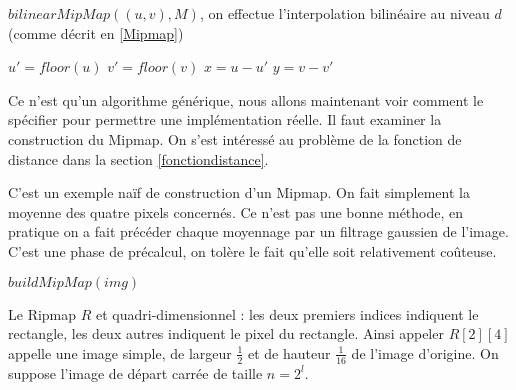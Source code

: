 \medbreak
\medbreak
\medbreak
\medbreak

\begin{algorithm}[H]
\caption{$bilinearMipMap((u,v),M)$,  on effectue l'interpolation bilinéaire au niveau $d$ (comme décrit en \ref{Mipmap})}
\label{intertri2}
$u'=floor(u)$\;
$v' = floor(v)$\;
$x=u-u'$\;
$y = v-v'$\;
\;
\end{algorithm}

\medbreak
\medbreak
Ce n'est qu'un algorithme générique, nous allons maintenant voir comment le spécifier pour permettre une implémentation réelle. Il faut examiner la construction du Mipmap. On s'est intéressé au problème de la fonction de distance dans la section \ref{fonctiondistance}.


C'est un exemple naïf de construction d'un Mipmap. On fait simplement la moyenne des quatre pixels concernés. Ce n'est pas une bonne méthode, en pratique on a fait précéder chaque moyennage par un filtrage gaussien de l'image. C'est une phase de précalcul, on tolère le fait qu'elle soit relativement coûteuse.

 \medbreak
  \medbreak
 \begin{algorithm}[H]
 \caption{$buildMipMap(img)$}
 \label{buildMipmap}
 \end{algorithm}
 \medbreak
  \medbreak

\label{pseudo_code_Ripmap}



Le Ripmap $R$ et quadri-dimensionnel  : les deux premiers indices indiquent le rectangle, les deux autres indiquent le pixel du rectangle. Ainsi appeler $R[2][4]$ appelle une image simple, de largeur $\frac{1}{2}$ et de hauteur $\frac{1}{16}$ de l'image d'origine. On suppose l'image de départ carrée de taille $n=2^l$.


